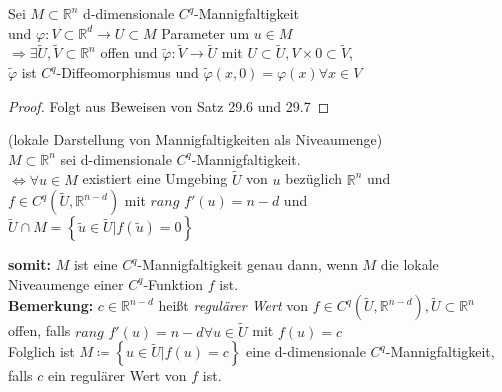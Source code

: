 \begin{folgerung}
Sei $M \subset \mathbb{R}^n$ d-dimensionale $C^q$-Mannigfaltigkeit \\
und $\varphi: V \subset \mathbb{R}^d \rightarrow U \subset M $ Parameter um $u \in M $ \\
$\Longrightarrow \exists \tilde{U}, \tilde{V} \subset \mathbb{R}^n $ offen und 
$\tilde{\varphi} : \tilde{V} \rightarrow \tilde{U} $ 
mit $ U \subset \tilde{U}, V \times {0} \subset \tilde{V} $, \\
$\tilde{\varphi} $ ist $C^q$-Diffeomorphismus und
$\tilde{\varphi} (x, 0) = \varphi (x) \forall x \in V $
\end{folgerung}

\begin{proof}
Folgt aus Beweisen von Satz 29.6 und 29.7
\end{proof}

\begin{theo}
(lokale Darstellung von Mannigfaltigkeiten als Niveaumenge)\\
$M \subset \mathbb{R}^n $ sei d-dimensionale $C^q$-Mannigfaltigkeit. \\
$\Longleftrightarrow \forall u \in M $ existiert eine Umgebing $\tilde{U}$ von $u$
bezüglich $\mathbb{R}^n$ und \\
$f \in C^q \left( \tilde{U}, \mathbb{R}^{n-d} \right)$ 
mit $\textit{rang } f' (u) = n-d $ und \\
$\tilde{U} \cap M = \left\lbrace \tilde{u} \in \tilde{U} | f (\tilde{u}) = 0 \right\rbrace $
\end{theo}

\textbf{somit:} $M$ ist eine $C^q$-Mannigfaltigkeit genau dann, 
wenn $M$ die lokale Niveaumenge einer $C^q$-Funktion $f$ ist. \\
\textbf{Bemerkung:} $c \in \mathbb{R}^{n-d} $ heißt \textit{regulärer Wert} von
$f \in C^q \left( \tilde{U}, \mathbb{R}^{n-d} \right), \tilde{U} \subset \mathbb{R}^n $
offen, falls $\textit{rang } f' (u) = n-d \forall u \in \tilde{U} $ mit $f(u) = c $ \\
Folglich ist $M \coloneqq \left\lbrace u \in \tilde{U} | f(u) = c \right\rbrace $ 
eine d-dimensionale $C^q$-Mannigfaltigkeit, falls $c$ ein regulärer Wert von $f$ ist.

